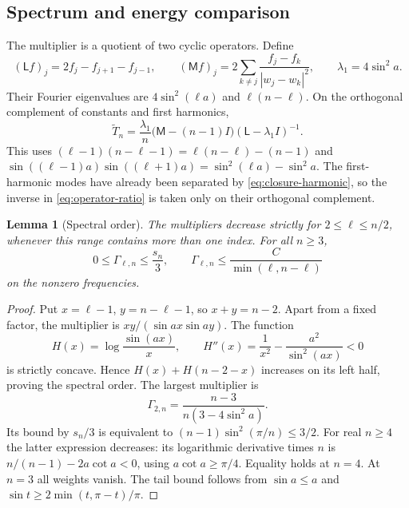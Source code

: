 \documentclass[11pt,reqno]{amsart}
\numberwithin{equation}{section}
\newtheorem{lemma}[theorem]{Lemma}
\theoremstyle{definition}
\theoremstyle{remark}
\begin{document}
\subsection{Spectrum and energy comparison}
The multiplier is a quotient of two cyclic operators. Define
\[
 (\mathsf Lf)_j=2f_j-f_{j+1}-f_{j-1},\qquad
 (\mathsf Mf)_j=2\sum_{k\ne j}\frac{f_j-f_k}{|w_j-w_k|^2},
 \qquad \lambda_1=4\sin^2a.
\]
Their Fourier eigenvalues are $4\sin^2(\ell a)$ and $\ell(n-\ell)$. On the orthogonal complement of constants and first harmonics,
\begin{equation}\label{eq:operator-ratio}
 \widetilde T_n=\frac{\lambda_1}{n}
 \bigl(\mathsf M-(n-1)I\bigr)(\mathsf L-\lambda_1I)^{-1}.
\end{equation}
This uses $(\ell-1)(n-\ell-1)=\ell(n-\ell)-(n-1)$ and
$\sin((\ell-1)a)\sin((\ell+1)a)=\sin^2(\ell a)-\sin^2a$.
The first-harmonic modes have already been separated by \eqref{eq:closure-harmonic}, so the inverse in \eqref{eq:operator-ratio} is taken only on their orthogonal complement.

\begin{lemma}[Spectral order]\label{lem:spectral-order}
The multipliers decrease strictly for $2\le\ell\le n/2$, whenever this range contains more than one index. For all $n\ge3$,
\begin{equation}\label{eq:spectral-gap}
 0\le\Gamma_{\ell,n}\le\frac{s_n}{3},
 \qquad
 \Gamma_{\ell,n}\le\frac{C}{\min(\ell,n-\ell)}
\end{equation}
on the nonzero frequencies.
\end{lemma}
\begin{proof}
Put $x=\ell-1$, $y=n-\ell-1$, so $x+y=n-2$. Apart from a fixed factor, the multiplier is $xy/(\sin ax\sin ay)$. The function
\[
 H(x)=\log\frac{\sin(ax)}x,
 \qquad H''(x)=\frac1{x^2}-\frac{a^2}{\sin^2(ax)}<0
\]
is strictly concave. Hence $H(x)+H(n-2-x)$ increases on its left half, proving the spectral order. The largest multiplier is
\[
 \Gamma_{2,n}=\frac{n-3}{n(3-4\sin^2a)}.
\]
Its bound by $s_n/3$ is equivalent to $(n-1)\sin^2(\pi/n)\le3/2$. For real $n\ge4$ the latter expression decreases: its logarithmic derivative times $n$ is $n/(n-1)-2a\cot a<0$, using $a\cot a\ge\pi/4$. Equality holds at $n=4$. At $n=3$ all weights vanish. The tail bound follows from $\sin a\le a$ and $\sin t\ge2\min(t,\pi-t)/\pi$.
\end{proof}
\end{document}
